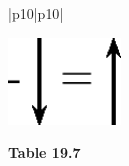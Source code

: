\begin{center}
\begin{xtabular*}{\mytablewidth}[t]{|p{10\mystarwidth}|p{10\mystarwidth}|}
                  
    \setcounter{subfigure}{0}

\label{m38813*id188922}
    \begin{center}
    \label{m38813*id188922!!!underscore!!!media}\label{m38813*id188922!!!underscore!!!printimage}\includegraphics[width=3cm]{col11305.imgs/m38813_PG11C1_034.png} %
        
      \vspace{2pt}
    \vspace{.1in}
    
    \end{center}



    \addtocounter{footnote}{-0}
    
     \tabularnewline{}
    \end{xtabular*}
      \end{center}
    \begin{center}{\small\bfseries Table 19.7}\end{center}
    
    \addtocounter{footnote}{-0}
    
    \par
  
        
        
    
      
    
    \setlength\mytablespace{4\tabcolsep}
    \addtolength\mytablespace{3\arrayrulewidth}
    \setlength\mytablewidth{\linewidth}
        

